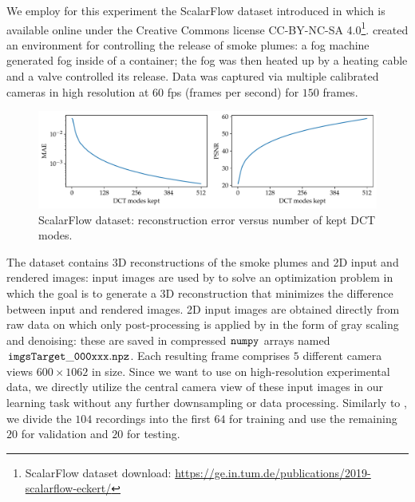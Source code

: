 We employ for this experiment the ScalarFlow dataset introduced in \citep{eckert2019scalarflow} which is available online under the Creative Commons license CC-BY-NC-SA 4.0\footnote{ScalarFlow dataset download: \href{https://ge.in.tum.de/publications/2019-scalarflow-eckert/}{https://ge.in.tum.de/publications/2019-scalarflow-eckert/}}. \cite{eckert2019scalarflow} created an environment for controlling the release of smoke plumes: a fog machine generated fog inside of a container; the fog was then heated up by a heating cable and a valve controlled its release. Data was captured via multiple calibrated cameras in high resolution at $60$ fps (frames per second) for $150$ frames. 

\begin{figure}[h!]
    \centering
    \includegraphics[width=0.8\linewidth]{figures/scalarflow_error_vs_dct_modes.pdf}
    \caption{\small ScalarFlow dataset: reconstruction error versus number of kept DCT modes.}
    \label{fig:scalarflow-modes-mae-psnr}
    \vspace{-3mm}
\end{figure}

The dataset contains 3D reconstructions of the smoke plumes and 2D input and rendered images: input images are used by \cite{eckert2019scalarflow} to solve an optimization problem in which the goal is to generate a 3D reconstruction that minimizes the difference between input and rendered images. 2D input images are obtained directly from raw data on which only post-processing is applied by \citep{eckert2019scalarflow} in the form of gray scaling and denoising: these are saved in compressed $\tt numpy$ \citep{harris2020array} arrays named $\tt imgsTarget\_000xxx.npz$. Each resulting frame comprises $5$ different camera views $600\times1062$ in size. Since we want to use \ourmethod{} on high-resolution experimental data, we directly utilize the central camera view of these input images in our learning task without any further downsampling or data processing. Similarly to \citep{lienen2022learning}, we divide the  $104$ recordings into the first $64$ for training and use the remaining $20$ for validation and $20$ for testing. 

